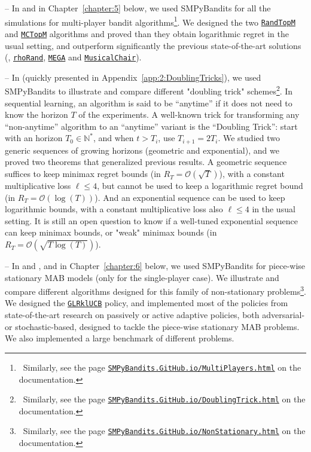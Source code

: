 -- In \cite{Besson2018ALT} and in Chapter~\ref{chapter:5} below, we used SMPyBandits for all the simulations for multi-player bandit algorithms\footnote{~Similarly, see the page \texttt{\href{https://SMPyBandits.GitHub.io/MultiPlayers.html}{SMPyBandits.GitHub.io/MultiPlayers.html}} on the documentation.}. We designed the two \texttt{\href{https://SMPyBandits.GitHub.io/docs/PoliciesMultiPlayers.RandTopM.html}{RandTopM}} and \texttt{\href{https://SMPyBandits.GitHub.io/docs/PoliciesMultiPlayers.MCTopM.html}{MCTopM}} algorithms and proved than they obtain logarithmic regret in the usual setting, and outperform significantly the previous state-of-the-art solutions (\ie, \texttt{\href{https://SMPyBandits.GitHub.io/docs/PoliciesMultiPlayers.rhoRand.html}{rhoRand}}, \texttt{\href{https://SMPyBandits.GitHub.io/docs/Policies.MEGA.html}{MEGA}} and \texttt{\href{https://SMPyBandits.GitHub.io/docs/Policies.MusicalChair.html}{MusicalChair}}).

-- In \cite{Besson2018DoublingTricks} (quickly presented in Appendix~\ref{app:2:DoublingTricks}), we used SMPyBandits to illustrate and compare different "doubling trick" schemes\footnote{~Similarly, see the page \texttt{\href{https://SMPyBandits.GitHub.io/DoublingTrick.html}{SMPyBandits.GitHub.io/DoublingTrick.html}} on the documentation.}.
In sequential learning, an algorithm is said to be ``anytime'' if it does not need to know the horizon $T$ of the experiments. A well-known trick for transforming any ``non-anytime'' algorithm to an ``anytime'' variant is the ``Doubling Trick'': start with an horizon $T_0\in\mathbb{N}^*$, and when $t > T_i$, use $T_{i+1} = 2 T_i$. We studied two generic sequences of growing horizons (geometric and exponential), and we proved two theorems that generalized previous results. A geometric sequence suffices to keep minimax regret bounds (in $R_T = \mathcal{O}(\sqrt{T})$), with a constant multiplicative loss $\ell \leq 4$, but cannot be used to keep a logarithmic regret bound (in $R_T = \mathcal{O}(\log(T))$). And an exponential sequence can be used to keep logarithmic bounds, with a constant multiplicative loss also $\ell \leq 4$ in the usual setting. It is still an open question to know if a well-tuned exponential sequence can keep minimax bounds, or "weak" minimax bounds (in $R_T = \mathcal{O}(\sqrt{T \log(T)})$).

-- In \cite{Besson2019GLRT} and \cite{Besson2019Gretsi}, and in Chapter~\ref{chapter:6} below, we used SMPyBandits for piece-wise stationary MAB models (only for the single-player case). We illustrate and compare different algorithms designed for this family of non-stationary problems\footnote{~Similarly, see the page \texttt{\href{https://SMPyBandits.GitHub.io/NonStationary.html}{SMPyBandits.GitHub.io/NonStationary.html}} on the documentation.}.
We designed the \texttt{\href{https://SMPyBandits.GitHub.io/docs/Policies.GLR_UCB.html}{GLRklUCB}} policy, and implemented most of the policies from state-of-the-art research on passively or active adaptive policies, both adversarial- or stochastic-based, designed to tackle the piece-wise stationary MAB problems.
We also implemented a large benchmark of different problems.


